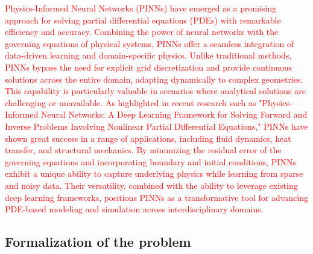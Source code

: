 \documentclass[12pt,letterpaper]{article}
\begin{document}
\textcolor{red}{ Physics-Informed Neural Networks (PINNs) have emerged as a promising approach for solving partial differential equations (PDEs) with remarkable efficiency and accuracy. Combining the power of neural networks with the governing equations of physical systems, PINNs offer a seamless integration of data-driven learning and domain-specific physics. Unlike traditional methods, PINNs bypass the need for explicit grid discretization and provide continuous solutions across the entire domain, adapting dynamically to complex geometries. This capability is particularly valuable in scenarios where analytical solutions are challenging or unavailable. As highlighted in recent research such as "Physics-Informed Neural Networks: A Deep Learning Framework for Solving Forward and Inverse Problems Involving Nonlinear Partial Differential Equations," PINNs have shown great success in a range of applications, including fluid dynamics, heat transfer, and structural mechanics. By minimizing the residual error of the governing equations and incorporating boundary and initial conditions, PINNs exhibit a unique ability to capture underlying physics while learning from sparse and noisy data. Their versatility, combined with the ability to leverage existing deep learning frameworks, positions PINNs as a transformative tool for advancing PDE-based modeling and simulation across interdisciplinary domains.}



\subsection{Formalization of the problem}
\end{document}
